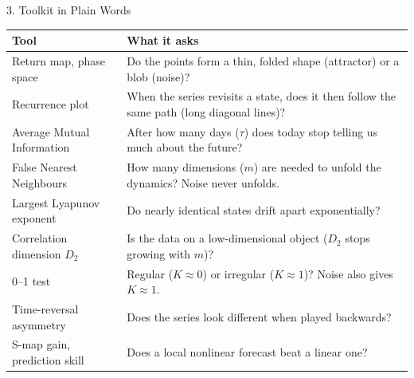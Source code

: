 \documentclass[aspectratio=169,10pt]{beamer}
\begin{document}
\begin{frame}{3. Toolkit in Plain Words}
    \centering
    \footnotesize
    \begin{tabularx}{\textwidth}{lX}
        \toprule
        Tool & What it asks \\
        \midrule
        Return map, phase space & Do the points form a thin, folded shape (attractor) or a blob (noise)? \\
        Recurrence plot & When the series revisits a state, does it then follow the same path (long diagonal lines)? \\
        Average Mutual Information & After how many days ($\tau$) does today stop telling us much about the future? \\
        False Nearest Neighbours & How many dimensions ($m$) are needed to unfold the dynamics? Noise never unfolds. \\
        Largest Lyapunov exponent & Do nearly identical states drift apart exponentially? \\
        Correlation dimension $D_2$ & Is the data on a low-dimensional object ($D_2$ stops growing with $m$)? \\
        0--1 test & Regular ($K\approx0$) or irregular ($K\approx1$)? Noise also gives $K\approx1$. \\
        Time-reversal asymmetry & Does the series look different when played backwards? \\
        S-map gain, prediction skill & Does a local nonlinear forecast beat a linear one? \\
        \bottomrule
    \end{tabularx}
\end{frame}
\end{document}
